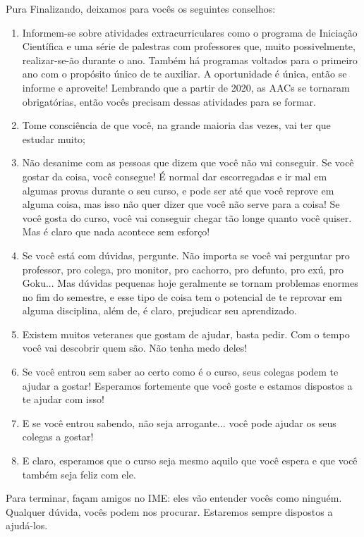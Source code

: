 \begin{subsecao}{Pura}
Finalizando, deixamos para vocês os seguintes conselhos:
\begin{enumerate}
\item Informem-se sobre atividades extracurriculares como o programa de
Iniciação Científica e uma série de palestras com professores que, muito possivelmente,
realizar-se-ão durante o ano. Também há programas voltados para o primeiro ano
com o propósito único de te auxiliar. A oportunidade é única, então se informe e aproveite!
Lembrando que a partir de 2020, as AACs se tornaram obrigatórias, então vocês precisam
dessas atividades para se formar.
\item Tome consciência de que você, na grande maioria das vezes, vai ter que
estudar muito;
\item Não desanime com as pessoas que dizem que você não vai conseguir. Se
você gostar da coisa, você consegue! É normal dar escorregadas e ir mal em algumas
provas durante o seu curso, e pode ser até que você reprove em alguma coisa,
mas isso não quer dizer que você não serve para a coisa! Se você gosta do curso,
você vai conseguir chegar tão longe quanto você quiser. Mas é claro que nada
acontece sem esforço!
\item Se você está com dúvidas, pergunte. Não importa se você vai perguntar
pro professor, pro colega, pro monitor, pro cachorro, pro defunto, pro exú, pro
Goku... Mas dúvidas pequenas hoje geralmente se tornam problemas enormes
no fim do semestre, e esse tipo de coisa tem o potencial de te reprovar em alguma
disciplina, além de, é claro, prejudicar seu aprendizado.
\item Existem muitos veteranes que gostam de ajudar, basta pedir. Com o tempo 
você vai descobrir quem são. Não tenha medo deles!
\item Se você entrou sem saber ao certo como é o curso, seus colegas podem
te ajudar a gostar! Esperamos fortemente que você goste e estamos dispostos a te ajudar com isso!
\item E se você entrou sabendo, não seja arrogante... você pode ajudar os seus
colegas a gostar!
\item E claro, esperamos que o curso seja mesmo aquilo que você
espera e que você também seja feliz com ele.

\end{enumerate}
Para terminar, façam amigos no IME: eles vão entender vocês como ninguém. Qualquer dúvida,
vocês podem nos procurar. Estaremos sempre dispostos a ajudá-los.

\end{subsecao}
